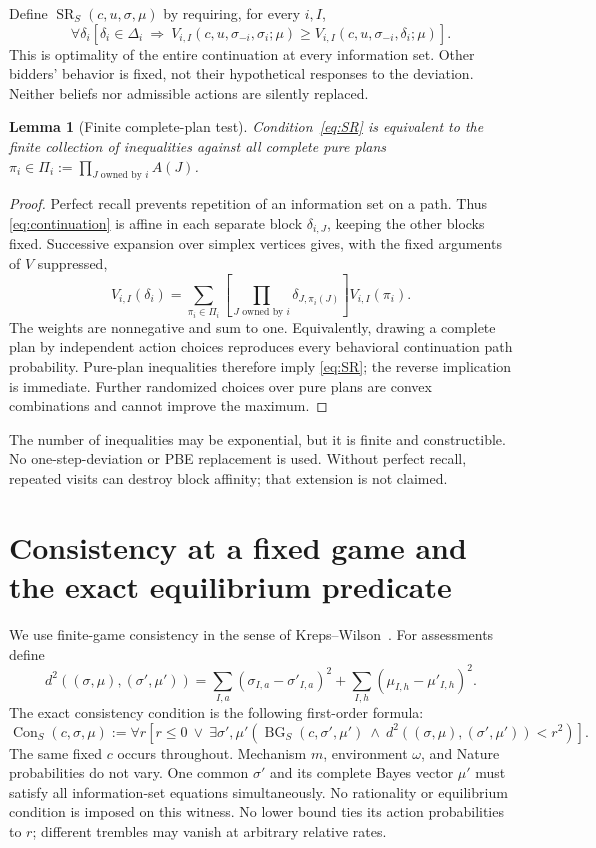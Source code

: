 \documentclass[11pt,a4paper]{article}
\numberwithin{equation}{section}
\newtheorem{lemma}[theorem]{Lemma}
\theoremstyle{definition}
\DeclareMathOperator{\BG}{BG}
\DeclareMathOperator{\SR}{SR}
\DeclareMathOperator{\Con}{Con}
\begin{document}
Define \(\SR_S(c,u,\sigma,\mu)\) by requiring, for every \(i,I\),
\begin{equation}\label{eq:SR}
 \forall\delta_i\left[
   \delta_i\in\Delta_i\ \Longrightarrow\
   V_{i,I}(c,u,\sigma_{-i},\sigma_i;\mu)
   \ge V_{i,I}(c,u,\sigma_{-i},\delta_i;\mu)\right].
\end{equation}
This is optimality of the entire continuation at every information
set. Other bidders' behavior is fixed, not their hypothetical responses
to the deviation. Neither beliefs nor admissible actions are silently
replaced.

\begin{lemma}[Finite complete-plan test]\label{lem:pure}
Condition~\eqref{eq:SR} is equivalent to the finite collection of
inequalities against all complete pure plans
\(\pi_i\in\Pi_i:=\prod_{J\text{ owned by }i}A(J)\).
\end{lemma}
\begin{proof}
Perfect recall prevents repetition of an information set on a path.
Thus \eqref{eq:continuation} is affine in each separate block
\(\delta_{i,J}\), keeping the other blocks fixed.
Successive expansion over simplex vertices gives, with the fixed
arguments of \(V\) suppressed,
\[
 V_{i,I}(\delta_i)
 =\sum_{\pi_i\in\Pi_i}
   \left[\prod_{J\text{ owned by }i}\delta_{J,\pi_i(J)}\right]
       V_{i,I}(\pi_i).
\]
The weights are nonnegative and sum to one.
Equivalently, drawing a complete plan by independent action choices
reproduces every behavioral continuation path probability.
Pure-plan inequalities therefore imply \eqref{eq:SR}; the reverse
implication is immediate. Further randomized choices over pure plans
are convex combinations and cannot improve the maximum.
\end{proof}
The number of inequalities may be exponential, but it is finite and
constructible. No one-step-deviation or PBE replacement is used.
Without perfect recall, repeated visits can destroy block affinity;
that extension is not claimed.

\section{Consistency at a fixed game and the exact equilibrium predicate}
\label{sec:consistency}
We use finite-game consistency in the sense of
Kreps--Wilson~\cite{KW1982}.
For assessments define
\[
 d^2((\sigma,\mu),(\sigma',\mu'))
 =\sum_{I,a}(\sigma_{I,a}-\sigma'_{I,a})^2
       +\sum_{I,h}(\mu_{I,h}-\mu'_{I,h})^2.
\]
The exact consistency condition is the following first-order formula:
\begin{equation}\label{eq:consistency}
 \Con_S(c,\sigma,\mu):=
 \forall r\left[
 r\le0\ \vee\
 \exists\sigma',\mu'\left(
 \BG_S(c,\sigma',\mu')\ \wedge\
 d^2((\sigma,\mu),(\sigma',\mu'))<r^2\right)\right].
\end{equation}
The same fixed \(c\) occurs throughout. Mechanism \(m\), environment
\(\omega\), and Nature probabilities do not vary.
One common \(\sigma'\) and its complete Bayes vector \(\mu'\) must
satisfy all information-set equations simultaneously.
No rationality or equilibrium condition is imposed on this witness.
No lower bound ties its action probabilities to \(r\); different
trembles may vanish at arbitrary relative rates.
\end{document}
